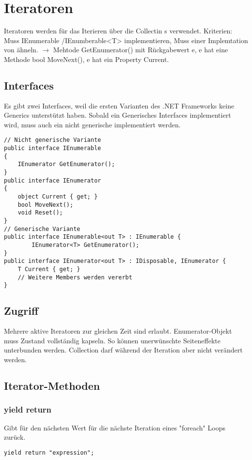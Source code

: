 \section{Iteratoren}
Iteratoren werden für das Iterieren über die Collectin s verwendet. Kriterien: Muss IEnumerable /IEnumberable<T> implementieren, Muss einer Implemtation von ähneln. $\rightarrow$ Mehtode GetEnumerator() mit Rückgabewert e, e hat eine Methode bool MoveNext(), e hat ein Property Current.

\subsection{Interfaces}
Es gibt zwei Interfaces, weil die ersten Varianten des .NET Frameworks keine Generics unterstützt haben. Sobald ein Generisches Interfaces implementiert wird, muss auch ein nicht generische implementiert werden.

\begin{lstlisting}
// Nicht generische Variante
public interface IEnumerable
{
	IEnumerator GetEnumerator();
}
public interface IEnumerator
{
	object Current { get; } 
	bool MoveNext(); 
	void Reset();
}
// Generische Variante
public interface IEnumerable<out T> : IEnumerable {
		IEnumerator<T> GetEnumerator();
}
public interface IEnumerator<out T> : IDisposable, IEnumerator {
	T Current { get; } 
	// Weitere Members werden vererbt
}
\end{lstlisting}

\subsection{Zugriff}
Mehrere aktive Iteratoren zur gleichen Zeit sind erlaubt. Enumerator-Objekt muss Zustand vollständig kapseln. So können unerwünschte Seiteneffekte unterbunden werden. Collection darf während der Iteration aber nicht verändert werden.

\subsection{Iterator-Methoden}
\subsubsection{yield return}
Gibt für den nächsten Wert für die nächste Iteration eines "foreach" Loops zurück.
\begin{lstlisting}
yield return "expression";
\end{lstlisting}

